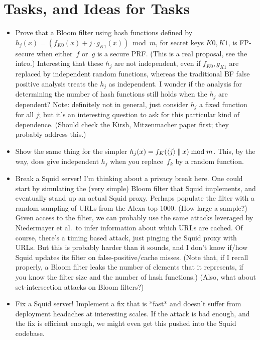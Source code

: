 \section{Tasks, and Ideas for Tasks}

\begin{itemize}
\item Prove that a Bloom filter using hash functions defined by $h_j(x) = \left( f_{K0}(x) + j\cdot g_{K1}(x)\right) \bmod m$, for secret keys $K0,K1$, is FP-secure when either~$f$ or~$g$ is a secure PRF.  (This is a real proposal, see the intro.)  Interesting that these $h_j$ are not independent, even if $f_{K0},g_{K1}$ are replaced by independent random functions, whereas the traditional BF false positive analysis treats the $h_j$ as independent.  I wonder if the analysis for determining the number of hash functions still holds when the $h_j$ are dependent?  Note: definitely not in general, just consider $h_j$ a fixed function for all $j$; but it's an interesting question to ask for this particular kind of dependence.  (Should check the Kirsh, Mitzenmacher paper first; they probably address this.)

\item Show the same thing for the simpler $h_j(x) = f_{K}(\langle j \rangle \: \| \: x) \bmod m$.  This, by the way, does give independent $h_j$ when you replace~$f_k$ by a random function.

\item Break a Squid server!  I'm thinking about a privacy break here.  One could start by simulating the (very simple) Bloom filter that Squid implements, and eventually stand up an actual Squid proxy.  Perhaps populate the filter with a random sampling of URLs from the Alexa top 1000.  (How large a sample?)  Given access to the filter, we can probably use the same attacks leveraged by Niedermayer et al.\ to infer information about which URLs are cached.  Of course, there's a timing based attack, just pinging the Squid proxy with URLs.   But this is probably harder than it sounds, and I don't know if/how Squid updates its filter on false-positive/cache misses.  (Note that, if I recall properly, a Bloom filter leaks the number of elements that it represents, if you know the filter size and the number of hash functions.) (Also, what about set-intersection attacks on Bloom filters?)

\item Fix a Squid server!  Implement a fix that is *fast* and doesn't suffer from deployment headaches at interesting scales.  If the attack is bad enough, and the fix is efficient enough, we might even get this pushed into the Squid codebase.


\end{itemize}

